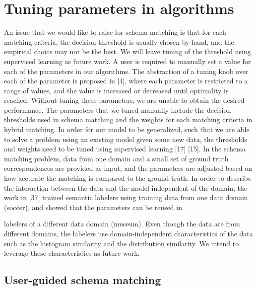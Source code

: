 \section{Tuning parameters in algorithms}
\label{sec:TuningParametersInAlgorithms}

An issue that we would like to raise for schema matching is that for each matching criteria, the decision threshold is usually chosen by hand, and the empirical choice may not be the best. We will leave tuning of the threshold using supervised learning as future work.
A user is required to manually set a value for each of the parameters in our algorithms. The abstraction of a tuning knob over each of the parameter is proposed in [4], where each parameter is restricted to a range of values, and the value is increased or decreased until optimality is reached. Without tuning these parameters, we are unable to obtain the desired performance. The parameters that we tuned manually include the decision thresholds used in schema matching and the weights for each matching criteria in hybrid matching. In order for our model to be generalized, such that we are able to solve a problem using an existing model given some new data, the thresholds and weights need to be tuned using supervised learning [17] [15]. In the schema matching problem, data from one domain and a small set of ground truth correspondences are provided as input, and the parameters are adjusted based on how accurate the matching is compared to the ground truth. In order to describe the interaction between the data and the model independent of the domain, the work in [37] trained semantic labelers using training data from one data domain (soccer), and showed that the parameters can be reused in

labelers of a different data domain (museum). Even though the data are from different domains, the labelers use domain-independent characteristics of the data such as the histogram similarity and the distribution similarity. We intend to leverage these characteristics as future work.

\subsection{User-guided schema matching}

